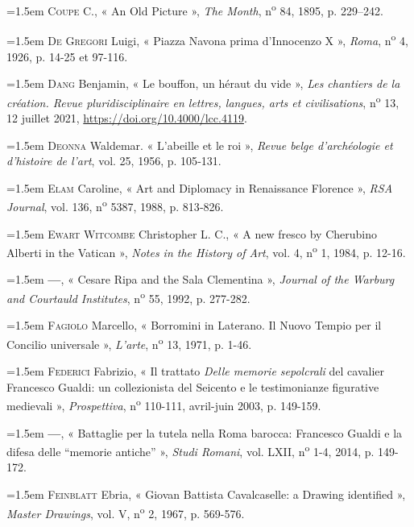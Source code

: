 \documentclass[12pt,twoside,openany]{book}
\newenvironment{PurhBibliography}
  {%
    \par
    \setlength{\parindent}{0pt}%
    \setlength{\leftskip}{0pt}%
  }
  {%
    \par
  }
\begin{document}
\begin{PurhBibliography}
\noindent\hangindent=1.5em \textsc{Coupe} C., « An Old Picture », \textit{The Month}, n\textsuperscript{o} 84, 1895, p. 229–242.\par
\noindent\hangindent=1.5em \textsc{De Gregori} Luigi, « Piazza Navona prima d’Innocenzo X », \textit{Roma}, n\textsuperscript{o} 4, 1926, p. 14-25 et 97-116.\par
\noindent\hangindent=1.5em \textsc{Dang} Benjamin, « Le bouffon, un héraut du vide », \textit{Les chantiers de la création. Revue pluridisciplinaire en lettres, langues, arts et civilisations}, n\textsuperscript{o} 13, 12 juillet 2021, \href{https://doi.org/10.4000/lcc.4119}{https://doi.org/10.4000/lcc.4119}.\par
\noindent\hangindent=1.5em \textsc{Deonna} Waldemar. « L’abeille et le roi », \textit{Revue belge d’archéologie et d’histoire de l’art}, vol. 25, 1956, p. 105‑131.\par
\noindent\hangindent=1.5em \textsc{Elam} Caroline, « Art and Diplomacy in Renaissance Florence », \textit{RSA Journal}, vol. 136, n\textsuperscript{o} 5387, 1988, p. 813‑826.\par
\noindent\hangindent=1.5em \textsc{Ewart Witcombe} Christopher L. C., « A new fresco by Cherubino Alberti in the Vatican », \textit{Notes in the History of Art}, vol. 4, n\textsuperscript{o} 1, 1984, p. 12-16.\par
\noindent\hangindent=1.5em \textbf{—}, « Cesare Ripa and the Sala Clementina », \textit{Journal of the Warburg and Courtauld Institutes}, n\textsuperscript{o} 55, 1992, p. 277-282.\par
\noindent\hangindent=1.5em \textsc{Fagiolo} Marcello, « Borromini in Laterano. Il Nuovo Tempio per il Concilio universale », \textit{L’arte}, n\textsuperscript{o} 13, 1971, p. 1-46.\par
\noindent\hangindent=1.5em \textsc{Federici} Fabrizio, « Il trattato \textit{Delle memorie sepolcrali} del cavalier Francesco Gualdi: un collezionista del Seicento e le testimonianze figurative medievali », \textit{Prospettiva}, n\textsuperscript{o} 110-111, avril-juin 2003, p. 149-159.\par
\noindent\hangindent=1.5em \textbf{—}, « Battaglie per la tutela nella Roma barocca: Francesco Gualdi e la difesa delle “memorie antiche” », \textit{Studi Romani}, vol. \textsc{LXII}, n\textsuperscript{o} 1-4, 2014, p. 149-172.\par
\noindent\hangindent=1.5em \textsc{Feinblatt} Ebria, « Giovan Battista Cavalcaselle: a Drawing identified », \textit{Master Drawings}, vol. V, n\textsuperscript{o} 2, 1967, p. 569-576.\par

\end{PurhBibliography}
\end{document}
